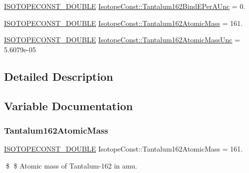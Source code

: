\begin{DoxyCompactItemize}
\mbox{\hyperlink{group___isotope_const-_macros_ga8f45a7272ce02c0b4c65c44636ed719a}{I\+S\+O\+T\+O\+P\+E\+C\+O\+N\+S\+T\+\_\+\+D\+O\+U\+B\+LE}} \mbox{\hyperlink{group___isotope_const-_tantalum-_ta162_gaccd27d22473bc2962a811f7b1cbb839c}{Isotope\+Const\+::\+Tantalum162\+Bind\+E\+Per\+A\+Unc}} = 0.
\item 
\mbox{\hyperlink{group___isotope_const-_macros_ga8f45a7272ce02c0b4c65c44636ed719a}{I\+S\+O\+T\+O\+P\+E\+C\+O\+N\+S\+T\+\_\+\+D\+O\+U\+B\+LE}} \mbox{\hyperlink{group___isotope_const-_tantalum-_ta162_ga7e533b6aa4ced06d5ff8a58f864788b8}{Isotope\+Const\+::\+Tantalum162\+Atomic\+Mass}} = 161.
\item 
\mbox{\hyperlink{group___isotope_const-_macros_ga8f45a7272ce02c0b4c65c44636ed719a}{I\+S\+O\+T\+O\+P\+E\+C\+O\+N\+S\+T\+\_\+\+D\+O\+U\+B\+LE}} \mbox{\hyperlink{group___isotope_const-_tantalum-_ta162_ga32a36e4ae0af2fe86c7925695947e1cf}{Isotope\+Const\+::\+Tantalum162\+Atomic\+Mass\+Unc}} = 5.\+6079e-\/05
\end{DoxyCompactItemize}


\subsection{Detailed Description}


\subsection{Variable Documentation}
\mbox{\label{group___isotope_const-_tantalum-_ta162_ga7e533b6aa4ced06d5ff8a58f864788b8}} 
\subsubsection{\texorpdfstring{Tantalum162\+Atomic\+Mass}{Tantalum162AtomicMass}}
{\footnotesize\ttfamily \mbox{\hyperlink{group___isotope_const-_macros_ga8f45a7272ce02c0b4c65c44636ed719a}{I\+S\+O\+T\+O\+P\+E\+C\+O\+N\+S\+T\+\_\+\+D\+O\+U\+B\+LE}} Isotope\+Const\+::\+Tantalum162\+Atomic\+Mass = 161.}

\$ \$ Atomic mass of Tantalum-\/162 in amu. \mbox{\label{group___isotope_const-_tantalum-_ta162_ga32a36e4ae0af2fe86c7925695947e1cf}} 
